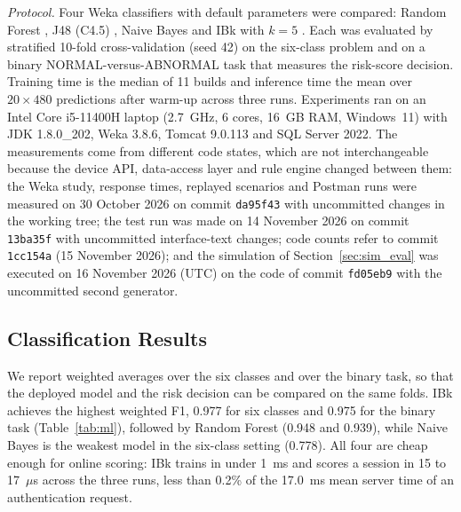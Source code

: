 \documentclass[journal,onecolumn]{IEEEtran}
\newcommand{\baselinecommit}{da95f43}
\newcommand{\revisioncommit}{1cc154a}
\begin{document}
\textit{Protocol.} Four Weka classifiers with default parameters were compared: Random Forest \cite{breiman2001rf},
J48 (C4.5) \cite{quinlan1993c45}, Naive Bayes \cite{john1995nb} and IBk with $k = 5$ \cite{aha1991ibl}. Each was
evaluated by stratified 10-fold cross-validation \cite{kohavi1995cv} (seed 42) on the six-class problem and on a binary
NORMAL-versus-ABNORMAL task that measures the risk-score decision. Training time is the median of 11 builds and
inference time the mean over $20 \times 480$ predictions after warm-up across three runs. Experiments ran on an Intel
Core i5-11400H laptop (2.7~GHz, 6 cores, 16~GB RAM, Windows~11) with JDK 1.8.0\_202, Weka 3.8.6, Tomcat 9.0.113 and SQL
Server 2022. The measurements come from different code states, which are not interchangeable because the device API,
data-access layer and rule engine changed between them: the Weka study, response times, replayed scenarios and Postman
runs were measured on 30 October 2026 on commit \texttt{\baselinecommit} with uncommitted changes in the working tree;
the test run was made on 14 November 2026 on commit \texttt{13ba35f} with uncommitted interface-text changes; code
counts refer to commit \texttt{\revisioncommit} (15 November 2026); and the simulation of Section~\ref{sec:sim_eval}
was executed on 16 November 2026 (UTC) on the code of commit \texttt{fd05eb9} with the uncommitted second generator.

\subsection{Classification Results}

We report weighted averages over the six classes and over the binary task, so that the deployed model and the risk
decision can be compared on the same folds. IBk achieves the highest weighted F1, 0.977 for six classes and 0.975 for
the binary task (Table~\ref{tab:ml}), followed by Random Forest (0.948 and 0.939), while Naive Bayes is the weakest
model in the six-class setting (0.778). All four are cheap enough for online scoring: IBk trains in under 1~ms and scores a session in 15 to
17~$\mu$s across the three runs, less than 0.2\% of the 17.0~ms mean server time of an authentication request.
\end{document}
